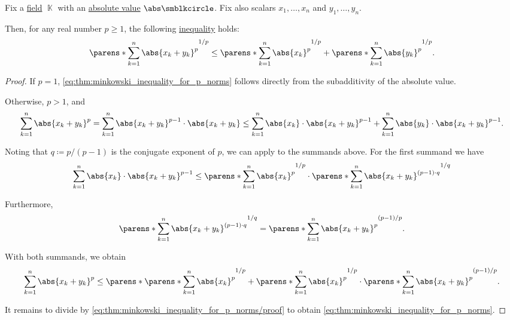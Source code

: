 \begin{theorem}\label{thm:minkowski_inequality_for_p_norms}
  Fix a \hyperref[def:field]{field} \( \BbbK \) with an \hyperref[def:absolute_value]{absolute value} \( \abs\anon \). Fix also scalars \( x_1, \ldots, x_n \) and \( y_1, \ldots, y_n \).

  Then, for any real number \( p \geq 1 \), the following \hyperref[def:inequality]{inequality} holds:
  \begin{equation}\label{eq:thm:minkowski_inequality_for_p_norms}
    \parens*{ \sum_{k=1}^n \abs{x_k + y_k}^p }^{1 / p} \leq \parens*{ \sum_{k=1}^n \abs{x_k}^p }^{1 / p} + \parens*{ \sum_{k=1}^n \abs{y_k}^p }^{1 / p}.
  \end{equation}
\end{theorem}
\begin{proof}
  If \( p = 1 \), \eqref{eq:thm:minkowski_inequality_for_p_norms} follows directly from the subadditivity of the absolute value.

  Otherwise, \( p > 1 \), and
  \begin{equation*}
    \sum_{k=1}^n \abs{x_k + y_k}^p
    =
    \sum_{k=1}^n \abs{x_k + y_k}^{p - 1} \cdot \abs{x_k + y_k}
    \leq
    \sum_{k=1}^n \abs{x_k} \cdot \abs{x_k + y_k}^{p - 1} + \sum_{k=1}^n \abs{y_k} \cdot \abs{x_k + y_k}^{p - 1}.
  \end{equation*}

  Noting that \( q \coloneqq p / (p - 1) \) is the conjugate exponent of \( p \), we can apply  to the summands above. For the first summand we have
  \begin{align*}
    \sum_{k=1}^n \abs{x_k} \cdot \abs{x_k + y_k}^{p - 1}
    \leq
    \parens*{ \sum_{k=1}^n \abs{x_k}^p }^{1 / p} \cdot \parens*{ \sum_{k=1}^n \abs{x_k + y_k}^{(p - 1) \cdot q} }^{1 / q}
  \end{align*}

  Furthermore,
  \begin{equation}\label{eq:thm:minkowski_inequality_for_p_norms/proof}
    \parens*{ \sum_{k=1}^n \abs{x_k + y_k}^{(p - 1) \cdot q} }^{1 / q}
    =
    \parens*{ \sum_{k=1}^n \abs{x_k + y_k}^p }^{(p - 1) / p}.
  \end{equation}

  With both summands, we obtain
  \begin{equation*}
    \sum_{k=1}^n \abs{x_k + y_k}^p
    \leq
    \parens*{ \parens*{ \sum_{k=1}^n \abs{x_k}^p }^{1 / p} + \parens*{ \sum_{k=1}^n \abs{x_k}^p }^{1 / p} } \cdot \parens*{ \sum_{k=1}^n \abs{x_k + y_k}^p }^{(p - 1) / p}.
  \end{equation*}

  It remains to divide by \eqref{eq:thm:minkowski_inequality_for_p_norms/proof} to obtain \eqref{eq:thm:minkowski_inequality_for_p_norms}.
\end{proof}

